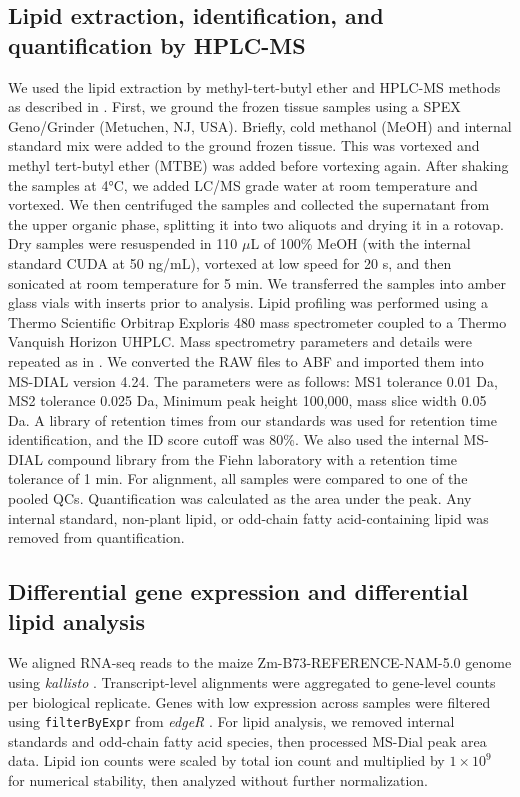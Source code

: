 \documentclass[9pt,twocolumn,twoside]{rilabRxiv}
\begin{document}
\subsection*{Lipid extraction, identification, and quantification by HPLC-MS}
We used the lipid extraction by methyl-tert-butyl ether \cite{matyash2008} and HPLC-MS methods as described in \cite{barnes2022}. 
First, we ground the frozen tissue samples using a SPEX Geno/Grinder (Metuchen, NJ, USA). 
Briefly, cold methanol (MeOH) and internal standard mix were added to the ground frozen tissue. This was vortexed and methyl tert-butyl ether (MTBE) was added before vortexing again.
After shaking the samples at 4°C, we added LC/MS grade water at room temperature and vortexed. 
We then centrifuged the samples and collected the supernatant from the upper organic phase, splitting it into two aliquots and drying it in a rotovap. 
Dry samples were resuspended in 110 $\mu$L of 100\% MeOH (with the internal standard CUDA at 50 ng/mL), vortexed at low speed for 20 s, and then sonicated at room temperature for 5 min. 
We transferred the samples into amber glass vials with inserts prior to analysis. Lipid profiling was performed using a Thermo Scientific Orbitrap Exploris 480 mass spectrometer coupled to a Thermo Vanquish Horizon UHPLC. Mass spectrometry parameters and details were repeated as in \cite{barnes2022}.
We converted the RAW files to ABF and imported them into MS-DIAL version 4.24.
The parameters were as follows: MS1 tolerance 0.01 Da, MS2 tolerance 0.025 Da, Minimum peak height 100,000, mass slice width 0.05 Da.
A library of retention times from our standards was used for retention time identification, and the ID score cutoff was 80\%.
We also used the internal MS-DIAL compound library from the Fiehn laboratory with a retention time tolerance of 1 min.
For alignment, all samples were compared to one of the pooled QCs.
Quantification was calculated as the area under the peak.
Any internal standard, non-plant lipid, or odd-chain fatty acid-containing lipid was removed from quantification.

\subsection*{Differential gene expression and differential lipid analysis}

We aligned RNA-seq reads to the maize Zm-B73-REFERENCE-NAM-5.0 genome using \textit{kallisto} \cite{bray2016}.
Transcript-level alignments were aggregated to gene-level counts per biological replicate.
Genes with low expression across samples were filtered using \texttt{filterByExpr} from \textit{edgeR} \cite{robinson2010}.
For lipid analysis, we removed internal standards and odd-chain fatty acid species, then processed MS-Dial peak area data.
Lipid ion counts were scaled by total ion count and multiplied by $1 \times 10^9$ for numerical stability, then analyzed without further normalization.
\end{document}
